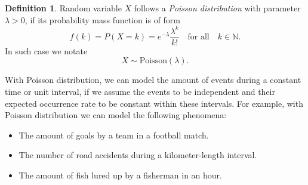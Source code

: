 \documentclass[12pt,a4paper,leqno]{report}
\newcommand{\N}{\mathbb{N}}
\theoremstyle{plain}
\theoremstyle{definition}
\newtheorem{maar}[equation]{Definition}
\begin{document}
\begin{maar}
Random variable $X$ follows a \emph{Poisson distribution} with parameter $\lambda > 0$, if its probability mass function is of form
\[
f(k) = P(X=k) = e^{-\lambda} \frac{\lambda^k}{k!} \quad \text{for all} \quad k \in \N.
\]
In such case we notate 
\[
X \sim \text{Poisson}(\lambda).
\]
\end{maar}

With Poisson distribution, we can model the amount of events during a constant time or unit interval, if we assume the events to be independent and their expected occurrence rate to be constant within these intervals. For example, with Poisson distribution we can model the following phenomena:
\begin{itemize}
\item The amount of goals by a team in a football match.
\item The number of road accidents during a kilometer-length interval.
\item The amount of fish lured up by a fisherman in an hour.
\end{itemize}
\end{document}
